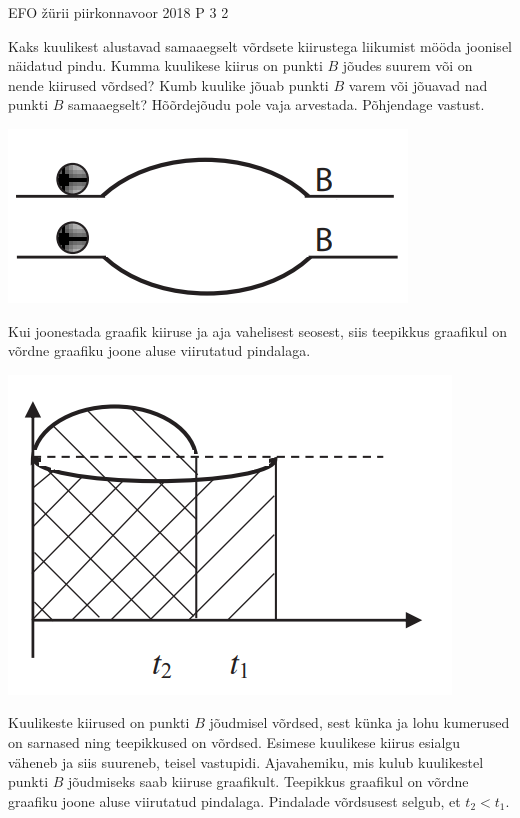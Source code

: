 {EFO žürii} %
{piirkonnavoor} %
{2018} %
{P 3} %
{2} %
{

\ifStatement
Kaks kuulikest alustavad samaaegselt võrdsete kiirustega liikumist mööda joonisel näidatud pindu. Kumma kuulikese kiirus on punkti $B$ jõudes suurem või on nende kiirused võrdsed? Kumb kuulike jõuab punkti $B$ varem või jõuavad nad punkti $B$ samaaegselt? Hõõrdejõudu pole vaja arvestada. Põhjendage vastust.
\begin{center}
	\includegraphics[width=0.5\linewidth]{2018-v2p-03-yl.PNG}
\end{center}
\fi

\ifHint
Kui joonestada graafik kiiruse ja aja vahelisest seosest, siis teepikkus graafikul on võrdne graafiku joone aluse viirutatud pindalaga.
\fi

\ifSolution
\begin{center}
	\includegraphics[width=0.5\linewidth]{2018-v2p-03-lah.PNG}
\end{center}
Kuulikeste kiirused on punkti $B$ jõudmisel võrdsed, sest künka ja lohu kumerused on sarnased ning teepikkused on võrdsed. Esimese kuulikese kiirus esialgu väheneb ja siis suureneb, teisel vastupidi. Ajavahemiku, mis kulub kuulikestel punkti $B$ jõudmiseks saab kiiruse graafikult. Teepikkus graafikul on võrdne graafiku joone aluse viirutatud pindalaga. Pindalade võrdsusest selgub, et $t_2 < t_1$.
\fi
}
